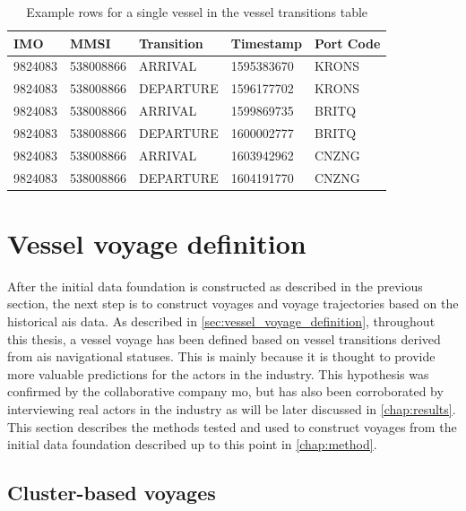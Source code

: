 \begin{table}[htbp]
    \centering
    \begin{tabular}{p{0.7in} p{0.9in} p{1in} p{1in} p{0.65in}}
    \hline
    \bfseries{IMO} & \bfseries{MMSI} & \bfseries{Transition} & \bfseries{Timestamp} & \bfseries{Port Code} \\ \hline
        9824083 & 538008866 & ARRIVAL   & 1595383670 & KRONS \\ \hline
        9824083 & 538008866 & DEPARTURE & 1596177702 & KRONS \\ \hline
        9824083 & 538008866 & ARRIVAL   & 1599869735 & BRITQ \\ \hline
        9824083 & 538008866 & DEPARTURE & 1600002777 & BRITQ \\ \hline
        9824083 & 538008866 & ARRIVAL   & 1603942962 & CNZNG \\ \hline
        9824083 & 538008866 & DEPARTURE & 1604191770 & CNZNG \\ \hline
    \end{tabular}
\caption{Example rows for a single vessel in the vessel transitions table}
\label{tab:vessel_transitions_example}
\end{table}

\section{Vessel voyage definition}

After the initial data foundation is constructed as described in the previous section, the next step is to construct voyages and voyage trajectories based on the historical \acrshort{ais} data. As described in \cref{sec:vessel_voyage_definition}, throughout this thesis, a vessel voyage has been defined based on vessel transitions derived from \acrshort{ais} navigational statuses. This is mainly because it is thought to provide more valuable predictions for the actors in the industry. This hypothesis was confirmed by the collaborative company \acrfull{mo}, but has also been corroborated by interviewing real actors in the industry as will be later discussed in \cref{chap:results}. This section describes the methods tested and used to construct voyages from the initial data foundation described up to this point in \cref{chap:method}.

\subsection{Cluster-based voyages}

